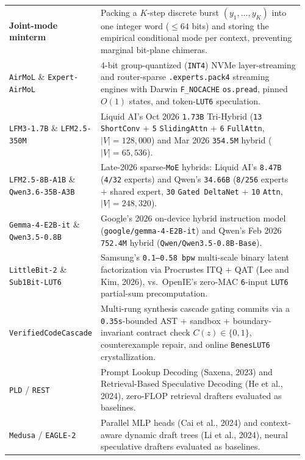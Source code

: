 \documentclass[10pt]{article}
\begin{document}
{\begin{longtable}{@{}L{0.27\linewidth}L{0.69\linewidth}@{}}
\textbf{Joint-mode minterm} & Packing a $K$-step discrete burst $(y_1,\dots,y_K)$ into one integer word ($\le 64$ bits) and storing the empirical conditional mode per context, preventing marginal bit-plane chimeras. \\
\addlinespace[3pt]
\texttt{AirMoL} \& \texttt{Expert-AirMoL} & 4-bit group-quantized (\texttt{INT4}) NVMe layer-streaming and router-sparse \texttt{.experts.pack4} streaming engines with Darwin \texttt{F\_NOCACHE} \texttt{os.pread}, pinned $O(1)$ states, and token-\texttt{LUT6} speculation. \\
\addlinespace[3pt]
\texttt{LFM3-1.7B} \& \texttt{LFM2.5-350M} & Liquid AI's Oct 2026 \texttt{1.73B} Tri-Hybrid (\texttt{13} \texttt{ShortConv} + \texttt{5} \texttt{SlidingAttn} + \texttt{6} \texttt{FullAttn}, $|V|=128{,}000$) and Mar 2026 \texttt{354.5M} hybrid ($|V|=65{,}536$). \\
\addlinespace[3pt]
\texttt{LFM2.5-8B-A1B} \& \texttt{Qwen3.6-35B-A3B} & Late-2026 sparse-\texttt{MoE} hybrids: Liquid AI's \texttt{8.47B} (\texttt{4/32} experts) and Qwen's \texttt{34.66B} (\texttt{8/256} experts + shared expert, \texttt{30} \texttt{Gated DeltaNet} + \texttt{10} \texttt{Attn}, $|V|=248{,}320$). \\
\addlinespace[3pt]
\texttt{Gemma-4-E2B-it} \& \texttt{Qwen3.5-0.8B} & Google's 2026 on-device hybrid instruction model (\texttt{google/gemma-4-E2B-it}) and Qwen's Feb 2026 \texttt{752.4M} hybrid (\texttt{Qwen/Qwen3.5-0.8B-Base}). \\
\addlinespace[3pt]
\texttt{LittleBit-2} \& \texttt{Sub1Bit-LUT6} & Samsung's \texttt{0.1--0.58 bpw} multi-scale binary latent factorization via Procrustes ITQ + QAT (Lee and Kim, 2026), vs.\ OpenIE's zero-MAC \texttt{6}-input \texttt{LUT6} partial-sum precomputation. \\
\addlinespace[3pt]
\texttt{VerifiedCodeCascade} & Multi-rung synthesis cascade gating commits via a \texttt{0.35s}-bounded AST + sandbox + boundary-invariant contract check $C(z)\in\{0,1\}$, counterexample repair, and online \texttt{BenesLUT6} crystallization. \\
\addlinespace[3pt]
\texttt{PLD} / \texttt{REST} & Prompt Lookup Decoding (Saxena, 2023) and Retrieval-Based Speculative Decoding (He et al., 2024), zero-FLOP retrieval drafters evaluated as baselines. \\
\addlinespace[3pt]
\texttt{Medusa} / \texttt{EAGLE-2} & Parallel MLP heads (Cai et al., 2024) and context-aware dynamic draft trees (Li et al., 2024), neural speculative drafters evaluated as baselines. \\

\end{longtable}}
\end{document}
